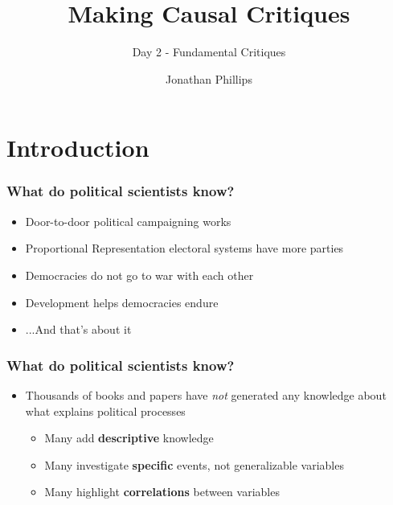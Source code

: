 \documentclass[xcolor=x11names,compress]{beamer}\usepackage[]{graphicx}\usepackage[]{color}
\title{Making Causal Critiques}
\subtitle{Day 2 - Fundamental Critiques}
\author{Jonathan Phillips}
\renewcommand{\(}{\begin{columns}}
\renewcommand{\)}{\end{columns}}
\newcommand{\<}[1]{\begin{column}{#1}}
\renewcommand{\>}{\end{column}}
\begin{document}
\frame{\titlepage}

\section{Introduction}

\begin{frame}
\frametitle{What do political scientists \textbf{know}?}
\begin{itemize}
\item Door-to-door political campaigning works
\pause
\item Proportional Representation electoral systems have more parties
\pause
\item Democracies do not go to war with each other
\pause
\item Development helps democracies endure
\pause
\item ...And that's about it
\end{itemize}
\end{frame}

\begin{frame}
\frametitle{What do political scientists \textbf{know}?}
\begin{itemize}
\item Thousands of books and papers have \textit{not} generated any knowledge about what explains political processes
\pause
\begin{itemize}
\item Many add \textbf{descriptive} knowledge
\pause
\item Many investigate \textbf{specific} events, not generalizable variables
\pause
\item Many highlight \textbf{correlations} between variables
\end{itemize}
\end{itemize}
\end{frame}
\end{document}
